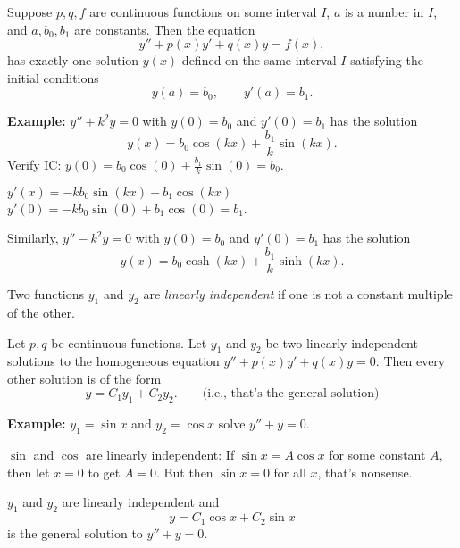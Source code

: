 \documentclass[10pt,aspectratio=169]{beamer}
\begin{document}
\begin{frame}

\begin{theorem}
Suppose $p, q, f$ are continuous functions on some interval
$I$, $a$ is a number in $I$,
and $a, b_0, b_1$ are constants.
\pause
Then the equation
\begin{equation*}
y'' + p(x) y' + q(x) y = f(x) ,
\end{equation*}
has exactly one solution $y(x)$ defined on the same interval $I$ satisfying the initial conditions
\begin{equation*}
y(a) = b_0 , \qquad y'(a) = b_1 .
\end{equation*}
\end{theorem}

\pause

\textbf{Example:}
$y'' + k^2 y = 0$ with $y(0) = b_0$ and $y'(0) = b_1$ has the solution
\[
y(x) = b_0 \cos (kx) + \frac{b_1}{k} \sin (kx) .
\]
\pause
Verify IC: \quad $y(0) = b_0 \cos (0) + \frac{b_1}{k} \sin (0) = b_0$.

\medskip
\pause
$y'(x) = - k b_0 \sin (kx) + b_1 \cos (kx)$
\wthus
\pause
$y'(0) = - k b_0 \sin (0) + b_1 \cos (0) = b_1$.

\medskip
\pause

Similarly, $y'' - k^2 y = 0$ with $y(0) = b_0$ and $y'(0) = b_1$
has the solution
\[
y(x) = b_0 \cosh (kx) + \frac{b_1}{k} \sinh (kx) .
\]
\end{frame}

\begin{frame}
Two functions $y_1$ and $y_2$ are
\emph{linearly independent} if one is not a constant multiple of the other.

\pause

\begin{theorem}
Let $p, q$ be continuous functions.
Let $y_1$ and $y_2$ be two linearly independent
solutions to the homogeneous equation
$y'' + p(x) y' + q(x) y = 0$.
\pause
Then every other solution is 
of the form
\begin{equation*}
y = C_1 y_1 + C_2 y_2 .
\qquad \text{(i.e., that's the general solution)}
\end{equation*}
\end{theorem}

\textbf{Example:}
$y_1 = \sin x$ and $y_2 = \cos x$ solve $y'' + y = 0$.

\medskip
\pause

$\sin$ and $\cos$ are linearly independent:
\pause
If $\sin x = A \cos x$ for some constant $A$,
then let $x=0$ to get $A = 0$.
\pause But then $\sin x = 0$ for all
$x$, that's nonsense.

\medskip
\pause

$y_1$ and $y_2$ are linearly independent and
\[
y = C_1 \cos x + C_2 \sin x 
\]
is the general solution to $y'' + y = 0$.

\end{frame}
\end{document}
